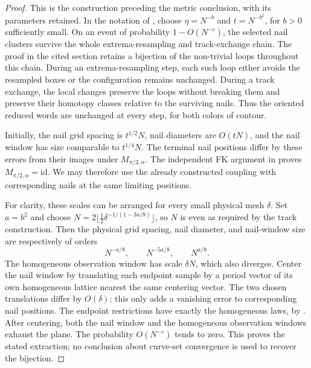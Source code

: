 \begin{proof}
This is the construction preceding the metric conclusion, with its
parameters retained.  In the notation of
\cite[Definition~3.8 and Section~3.6, pp.~49--50]{DCKKMO2026Rotation},
choose $\eta=N^{-b}$ and $t=N^{-b^2}$, for $b>0$ sufficiently small.
On an event of probability $1-O(N^{-c})$, the selected nail
clusters survive the whole extrema-resampling and track-exchange
chain.  The proof in the cited section retains a bijection of the
non-trivial loops throughout this chain.  During an extrema-resampling
step, each such loop either avoids the resampled boxes or the
configuration remains unchanged.  During a track exchange, the local
changes preserve the loops without breaking them and preserve their
homotopy classes relative to the surviving nails.  Thus the oriented
reduced words are unchanged at every step, for both colors of contour.

Initially, the nail grid spacing is $t^{1/2}N$, nail diameters
are $O(tN)$, and the nail window has size comparable to
$t^{1/4}N$.  The terminal nail positions differ by these errors
from their images under $M_{\pi/2,\alpha}$.  The independent FK
argument in \cite[Section~4.2, proof of Theorem~1.7]{DCKKMO2026Rotation}
proves $M_{\pi/2,\alpha}=\mathrm{id}$.  We may therefore use the
already constructed coupling with corresponding nails at the same
limiting positions.

For clarity, these scales can be arranged for every small physical
mesh $\delta$.  Set $a=b^2$ and choose
$N=2\lfloor\tfrac12\delta^{-1/(1-3a/8)}\rfloor$, so $N$
is even as required by the track construction.  Then the physical grid
spacing, nail diameter, and nail-window size are respectively of
orders
\[
 N^{-a/8},\qquad N^{-5a/8},\qquad N^{a/8}.
\]
The homogeneous observation window has scale $\delta N$, which
also diverges.  Center the nail window by translating each
endpoint sample by a period vector of its own homogeneous
lattice nearest the same centering vector.  The two chosen
translations differ by $O(\delta)$; this only adds a vanishing
error to corresponding nail positions.  The endpoint restrictions
have exactly the homogeneous laws, by
\cite[Proposition~2.11]{DCKKMO2026Rotation}.  After centering, both
the nail window and the homogeneous observation windows exhaust
the plane.  The probability $O(N^{-c})$ tends to zero.  This proves
the stated extraction; no conclusion about curve-set convergence
is used to recover the bijection.
\end{proof}

